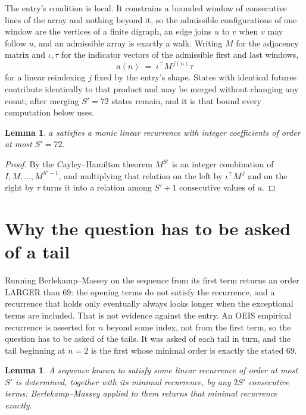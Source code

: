 \documentclass[11pt,a4paper]{article}
\theoremstyle{plain}
\newtheorem{lemma}[theorem]{Lemma}
\theoremstyle{definition}
\begin{document}
The entry's condition is local. It constrains a bounded window of consecutive lines of the
array and nothing beyond it, so the admissible configurations of one window are the vertices of
a finite digraph, an edge joins $u$ to $v$ when $v$ may follow $u$, and an admissible array is
exactly a walk. Writing $M$ for the adjacency matrix and $\iota,\tau$ for the indicator vectors
of the admissible first and last windows,
\[
a(n)\;=\;\iota^{\!\top}M^{\,j(n)}\tau
\]
for a linear reindexing $j$ fixed by the entry's shape. States with identical futures
contribute identically to that product and may be merged without changing any count; after
merging $S'=72$ states remain, and it is that bound every computation below uses.

\begin{lemma}\label{lem:cf}
$a$ satisfies a monic linear recurrence with integer coefficients of order at most $S'=72$.
\end{lemma}

\begin{proof}
By the Cayley--Hamilton theorem $M^{S'}$ is an integer combination of $I,M,\dots,M^{S'-1}$,
and multiplying that relation on the left by $\iota^{\!\top}M^{\,j}$ and on the right by
$\tau$ turns it into a relation among $S'+1$ consecutive values of $a$.
\end{proof}

\section{Why the question has to be asked of a tail}

Running Berlekamp--Massey on the sequence from its first term returns an order LARGER than $69$: the opening terms do not satisfy the recurrence, and a recurrence that holds only eventually always looks longer when the exceptional terms are included. That is not evidence against the entry. An OEIS empirical recurrence is asserted for $n$ beyond some index, not from the first term, so the question has to be asked of the tails. It was asked of each tail in turn, and the tail beginning at $n=2$ is the first whose minimal order is exactly the stated $69$.

\begin{lemma}\label{lem:bm}
A sequence known to satisfy some linear recurrence of order at most $S'$ is determined,
together with its minimal recurrence, by any $2S'$ consecutive terms: Berlekamp--Massey applied
to them returns that minimal recurrence exactly.
\end{lemma}
\end{document}
